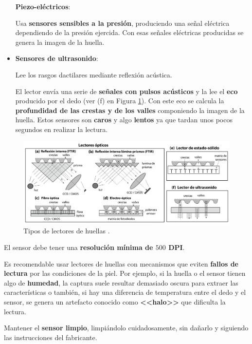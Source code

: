 \begin{itemize}
    \textbf{Piezo-eléctricos}:
    
    Usa \textbf{sensores sensibles a la presión}, produciendo una señal eléctrica dependiendo de la presión ejercida. Con esas señales eléctricas producidas se genera la imagen de la huella.
    
    \item
    \textbf{Sensores de ultrasonido}:
    
    Lee los rasgos dactilares mediante reflexión acústica.
    
    El lector envía una serie de \textbf{señales con pulsos acústicos} y la lee el \textbf{eco} producido por el dedo  (ver (f) en Figura \ref{fig:SensoresDactilares}). Con este eco se calcula la \textbf{profundidad de las crestas y de los valles} componiendo la imagen de la huella. Estos sensores son \textbf{caros} y algo \textbf{lentos} ya que tardan unos pocos segundos en realizar la lectura.
    
\end{itemize}

\begin{figure}[t]
    \centering
    \includegraphics[width=1\linewidth]{ch-sistemasABC/images/ch-biometricosABC/sensores_dactilares.png}
    \caption{Tipos de lectores de huellas \cite{maltoni2009handbook}.}
    \label{fig:SensoresDactilares}
\end{figure}

El sensor debe tener una \textbf{resolución mínima de $500$ \gls{DPI}}.

Es recomendable usar lectores de huellas con mecanismos que eviten \textbf{fallos de lectura} por las condiciones de la piel. Por ejemplo, si la huella o el sensor tienen algo de \textbf{humedad}, la captura suele resultar demasiado oscura para extraer las características o también, si hay una diferencia de temperatura entre el dedo y el sensor, se genera un artefacto conocido como \textbf{<<halo>>} que dificulta la lectura. 
 
Mantener el \textbf{sensor limpio}, limpiándolo cuidadosamente, sin dañarlo y siguiendo las instrucciones del fabricante.

